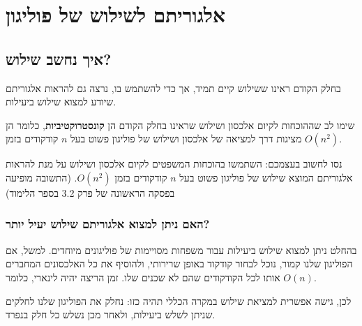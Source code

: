\documentclass[
]{book}
\begin{document}
\hypertarget{ux5d0ux5dcux5d2ux5d5ux5e8ux5d9ux5eaux5dd-ux5dcux5e9ux5d9ux5dcux5d5ux5e9-ux5e9ux5dc-ux5e4ux5d5ux5dcux5d9ux5d2ux5d5ux5df}{%
\section{אלגוריתם לשילוש של פוליגון}\label{ux5d0ux5dcux5d2ux5d5ux5e8ux5d9ux5eaux5dd-ux5dcux5e9ux5d9ux5dcux5d5ux5e9-ux5e9ux5dc-ux5e4ux5d5ux5dcux5d9ux5d2ux5d5ux5df}}

\hypertarget{ux5d0ux5d9ux5da-ux5e0ux5d7ux5e9ux5d1-ux5e9ux5d9ux5dcux5d5ux5e9}{%
\subsection{איך נחשב שילוש?}\label{ux5d0ux5d9ux5da-ux5e0ux5d7ux5e9ux5d1-ux5e9ux5d9ux5dcux5d5ux5e9}}

בחלק הקודם ראינו ששילוש קיים תמיד, אך כדי להשתמש בו, נרצה גם להראות אלגוריתם שיודע למצוא שילוש ביעילות.

שימו לב שההוכחות לקיום אלכסון ושילוש שראינו בחלק הקודם הן \textbf{קונסטרוקטיביות}, כלומר הן מציגות דרך למציאה של אלכסון ושילוש של פוליגון פשוט בעל \(n\) קודקודים בזמן \(O(n^2)\).

נסו לחשוב בעצמכם: השתמשו בהוכחות המשפטים לקיום אלכסון ושילוש על מנת להראות אלגוריתם המוצא שילוש של פוליגון פשוט בעל \(n\) קודקודים בזמן \(O(n^2)\). (התשובה מופיעה בפסקה הראשונה של פרק 3.2 בספר הלימוד)

\hypertarget{ux5d4ux5d0ux5dd-ux5e0ux5d9ux5eaux5df-ux5dcux5deux5e6ux5d5ux5d0-ux5d0ux5dcux5d2ux5d5ux5e8ux5d9ux5eaux5dd-ux5e9ux5d9ux5dcux5d5ux5e9-ux5d9ux5e2ux5d9ux5dc-ux5d9ux5d5ux5eaux5e8}{%
\subsubsection*{האם ניתן למצוא אלגוריתם שילוש יעיל יותר?}\label{ux5d4ux5d0ux5dd-ux5e0ux5d9ux5eaux5df-ux5dcux5deux5e6ux5d5ux5d0-ux5d0ux5dcux5d2ux5d5ux5e8ux5d9ux5eaux5dd-ux5e9ux5d9ux5dcux5d5ux5e9-ux5d9ux5e2ux5d9ux5dc-ux5d9ux5d5ux5eaux5e8}}

בהחלט ניתן למצוא שילוש ביעילות עבור משפחות מסויימות של פוליגונים מיוחדים. למשל, אם הפוליגון שלנו קמור, נוכל לבחור קודקוד באופן שרירותי, ולהוסיף את כל האלכסונים המחברים אותו לכל הקודקודים שהם לא שכנים שלו. זמן הריצה יהיה לינארי, כלומר \(O(n)\).

לכן, גישה אפשרית למציאת שילוש במקרה הכללי תהיה כזו: נחלק את הפוליגון שלנו לחלקים שניתן לשלש ביעילות, ולאחר מכן נשלש כל חלק בנפרד.
\end{document}
